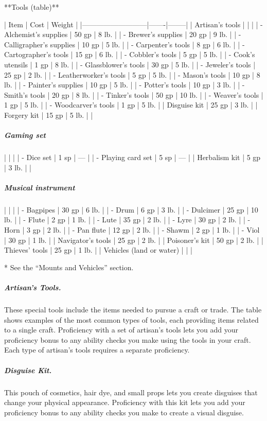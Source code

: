 **Tools (table)**

| Item                      | Cost  | Weight |
|---------------------------|-------|--------|
| Artisan's tools    |       |        |
| - Alchemist's supplies    | 50 gp | 8 lb.  |
| - Brewer's supplies       | 20 gp | 9 lb.  |
| - Calligrapher's supplies | 10 gp | 5 lb.  |
| - Carpenter's tools       | 8 gp  | 6 lb.  |
| - Cartographer's tools    | 15 gp | 6 lb.  |
| - Cobbler's tools         | 5 gp  | 5 lb.  |
| - Cook's utensils         | 1 gp  | 8 lb.  |
| - Glassblower's tools     | 30 gp | 5 lb.  |
| - Jeweler's tools         | 25 gp | 2 lb.  |
| - Leatherworker's tools   | 5 gp  | 5 lb.  |
| - Mason's tools           | 10 gp | 8 lb.  |
| - Painter's supplies      | 10 gp | 5 lb.  |
| - Potter's tools          | 10 gp | 3 lb.  |
| - Smith's tools           | 20 gp | 8 lb.  |
| - Tinker's tools          | 50 gp | 10 lb. |
| - Weaver's tools          | 1 gp  | 5 lb.  |
| - Woodcarver's tools      | 1 gp  | 5 lb.  |
| Disguise kit              | 25 gp | 3 lb.  |
| Forgery kit               | 15 gp | 5 lb.  |
| \subparagraph*{Gaming set}          |       |        |
| - Dice set                | 1 sp  | —      |
| - Playing card set        | 5 sp  | —      |
| Herbalism kit             | 5 gp  | 3 lb.  |
| \subparagraph*{Musical instrument}  |       |        |
| - Bagpipes                | 30 gp | 6 lb.  |
| - Drum                    | 6 gp  | 3 lb.  |
| - Dulcimer                | 25 gp | 10 lb. |
| - Flute                   | 2 gp  | 1 lb.  |
| - Lute                    | 35 gp | 2 lb.  |
| - Lyre                    | 30 gp | 2 lb.  |
| - Horn                    | 3 gp  | 2 lb.  |
| - Pan flute               | 12 gp | 2 lb.  |
| - Shawm                   | 2 gp  | 1 lb.  |
| - Viol                    | 30 gp | 1 lb.  |
| Navigator's tools         | 25 gp | 2 lb.  |
| Poisoner's kit            | 50 gp | 2 lb.  |
| Thieves' tools            | 25 gp | 1 lb.  |
| Vehicles (land or water)  | \*    | \*     |

* See the “Mounts and Vehicles” section.

\subparagraph*{Artisan's Tools.} These special tools include the items needed to pursue a craft or trade. The table shows examples of the most common types of tools, each providing items related to a single craft. Proficiency with a set of artisan's tools lets you add your proficiency bonus to any ability checks you make using the tools in your craft. Each type of artisan's tools requires a separate proficiency.

\subparagraph*{Disguise Kit.} This pouch of cosmetics, hair dye, and small props lets you create disguises that change your physical appearance. Proficiency with this kit lets you add your proficiency bonus to any ability checks you make to create a visual disguise.

